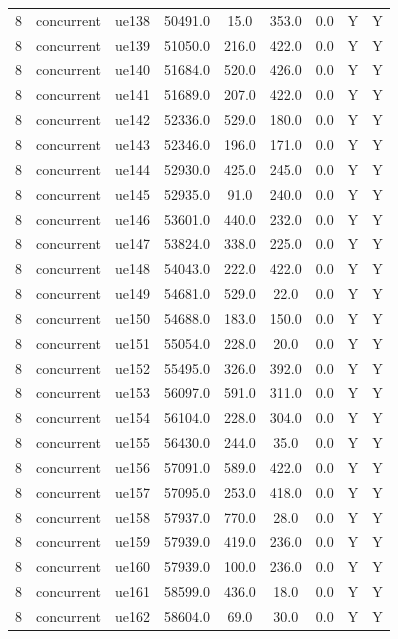 \begin{table}[ht]
\begin{tabular}{|c|c|c|c|c|c|c|c|c|}
8 & concurrent & ue138 & 50491.0 & 15.0 & 353.0 & 0.0 & Y & Y \\
8 & concurrent & ue139 & 51050.0 & 216.0 & 422.0 & 0.0 & Y & Y \\
8 & concurrent & ue140 & 51684.0 & 520.0 & 426.0 & 0.0 & Y & Y \\
8 & concurrent & ue141 & 51689.0 & 207.0 & 422.0 & 0.0 & Y & Y \\
8 & concurrent & ue142 & 52336.0 & 529.0 & 180.0 & 0.0 & Y & Y \\
8 & concurrent & ue143 & 52346.0 & 196.0 & 171.0 & 0.0 & Y & Y \\
8 & concurrent & ue144 & 52930.0 & 425.0 & 245.0 & 0.0 & Y & Y \\
8 & concurrent & ue145 & 52935.0 & 91.0 & 240.0 & 0.0 & Y & Y \\
8 & concurrent & ue146 & 53601.0 & 440.0 & 232.0 & 0.0 & Y & Y \\
8 & concurrent & ue147 & 53824.0 & 338.0 & 225.0 & 0.0 & Y & Y \\
8 & concurrent & ue148 & 54043.0 & 222.0 & 422.0 & 0.0 & Y & Y \\
8 & concurrent & ue149 & 54681.0 & 529.0 & 22.0 & 0.0 & Y & Y \\
8 & concurrent & ue150 & 54688.0 & 183.0 & 150.0 & 0.0 & Y & Y \\
8 & concurrent & ue151 & 55054.0 & 228.0 & 20.0 & 0.0 & Y & Y \\
8 & concurrent & ue152 & 55495.0 & 326.0 & 392.0 & 0.0 & Y & Y \\
8 & concurrent & ue153 & 56097.0 & 591.0 & 311.0 & 0.0 & Y & Y \\
8 & concurrent & ue154 & 56104.0 & 228.0 & 304.0 & 0.0 & Y & Y \\
8 & concurrent & ue155 & 56430.0 & 244.0 & 35.0 & 0.0 & Y & Y \\
8 & concurrent & ue156 & 57091.0 & 589.0 & 422.0 & 0.0 & Y & Y \\
8 & concurrent & ue157 & 57095.0 & 253.0 & 418.0 & 0.0 & Y & Y \\
8 & concurrent & ue158 & 57937.0 & 770.0 & 28.0 & 0.0 & Y & Y \\
8 & concurrent & ue159 & 57939.0 & 419.0 & 236.0 & 0.0 & Y & Y \\
8 & concurrent & ue160 & 57939.0 & 100.0 & 236.0 & 0.0 & Y & Y \\
8 & concurrent & ue161 & 58599.0 & 436.0 & 18.0 & 0.0 & Y & Y \\
8 & concurrent & ue162 & 58604.0 & 69.0 & 30.0 & 0.0 & Y & Y \\

\end{tabular}
\end{table}
